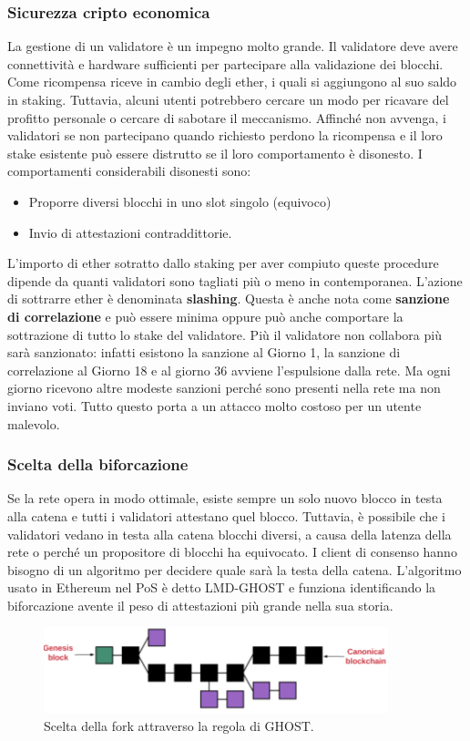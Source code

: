 \documentclass[a4paper,11pt]{report}
\begin{document}
\subsubsection{Sicurezza cripto economica}
La gestione di un validatore è un impegno molto grande. Il validatore deve avere connettività e hardware sufficienti per partecipare alla validazione dei blocchi. Come ricompensa  riceve in cambio degli ether, i quali si aggiungono al suo saldo in staking. Tuttavia, alcuni utenti potrebbero cercare un modo per ricavare del profitto personale o cercare di sabotare il meccanismo. Affinché non avvenga, i validatori se non partecipano quando richiesto perdono la ricompensa e il loro stake esistente può essere distrutto se il loro comportamento è disonesto. I comportamenti considerabili disonesti sono: 
\begin{itemize}
\item Proporre diversi blocchi in uno slot singolo (equivoco)
\item Invio di attestazioni contraddittorie. 
\end{itemize}
L'importo di ether sotratto dallo staking per aver compiuto queste procedure dipende da quanti validatori sono tagliati più o meno in contemporanea. L'azione di sottrarre ether è denominata \textbf{slashing}. Questa è anche nota come \textbf{sanzione di correlazione} e può essere minima oppure può anche comportare la sottrazione di tutto lo stake del validatore. Più il validatore non collabora più sarà sanzionato: infatti esistono la sanzione al Giorno 1, la sanzione di correlazione al Giorno 18 e al giorno 36 avviene l'espulsione dalla rete. Ma ogni giorno ricevono altre modeste sanzioni perché sono presenti nella rete ma non inviano voti. Tutto questo porta a un attacco molto costoso per un utente malevolo.

\newpage
\subsubsection{Scelta della biforcazione}
Se la rete opera in modo ottimale, esiste sempre un solo nuovo blocco in testa alla catena e tutti i validatori attestano quel blocco. Tuttavia, è possibile che i validatori vedano in testa alla catena blocchi diversi, a causa della latenza della rete o perché un propositore di blocchi ha equivocato. I client di consenso hanno bisogno di un algoritmo per decidere quale sarà la testa della catena. L'algoritmo usato in Ethereum nel PoS è detto LMD-GHOST e funziona identificando la biforcazione avente il peso di attestazioni più grande nella sua storia.
\begin{figure}[htbp] 
\begin{center}
\includegraphics[width=10cm]{img/ghs.png}
\end{center}
\caption{Scelta della fork attraverso la regola di GHOST. \cite{genesis}}
\end{figure}
\end{document}
